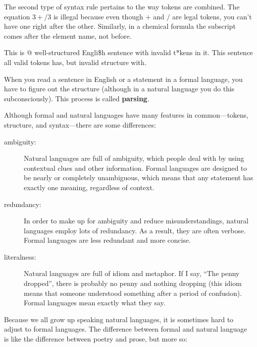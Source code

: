 \documentclass[10pt]{book}
\begin{document}
The second type of syntax rule pertains to the way tokens are
combined.  The equation $3 +/ 3$ is illegal because even though $+$
and $/$ are legal tokens, you can't have one right after the other.
Similarly, in a chemical formula the subscript comes after the element
name, not before.

This is @ well-structured Engli\$h
sentence with invalid t*kens in it.  This sentence all valid tokens
has, but invalid structure with.

When you read a sentence in English or a statement in a formal
language, you have to figure out the structure
(although in a natural language you do this subconsciously).  This
process is called {\bf parsing}.

Although formal and natural languages have many features in
common---tokens, structure, and syntax---there are some
differences:

\begin{description}

\item[ambiguity:] Natural languages are full of ambiguity, which
people deal with by using contextual clues and other information.
Formal languages are designed to be nearly or completely unambiguous,
which means that any statement has exactly one meaning,
regardless of context.

\item[redundancy:] In order to make up for ambiguity and reduce
misunderstandings, natural languages employ lots of
redundancy.  As a result, they are often verbose.  Formal languages
are less redundant and more concise.

\item[literalness:] Natural languages are full of idiom and metaphor.
If I say, ``The penny dropped'', there is probably no penny and
nothing dropping (this idiom means that someone understood something
after a period of confusion).  Formal languages
mean exactly what they say.

\end{description}

Because we all grow up speaking natural languages, it is sometimes
hard to adjust to formal languages.  The difference between formal and
natural language is like the difference between poetry and prose, but
more so:  
\end{document}
